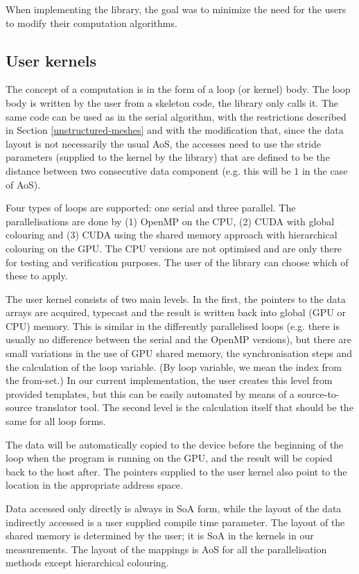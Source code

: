 When implementing the library, the goal was to minimize the need for the users
to modify their computation algorithms.

\subsection{User kernels}

The concept of a computation is in the form of a loop (or kernel) body. The loop
body is written by the user from a skeleton code, the library only calls it. The
same code can be used as in the serial algorithm, with the restrictions
described in Section \ref{unstructured-meshes} and with the modification that,
since the data layout is not necessarily the usual AoS, the accesses need to use
the stride parameters (supplied to the kernel by the library) that are defined
to be the distance between two consecutive data component (e.g. this will be $1$
in the case of AoS).

Four types of loops are supported: one serial and three parallel. The
parallelisations are done by (1) OpenMP on the CPU, (2) CUDA with global
colouring and (3) CUDA using the shared memory approach with hierarchical
colouring on the GPU. The CPU versions are not optimised and are only there for
testing and verification purposes. The user of the library can choose which of
these to apply.

The user kernel consists of two main levels. In the first, the pointers to the
data arrays are acquired, typecast and the result is written back into global
(GPU or CPU) memory. This is similar in the differently parallelised loops (e.g.
there is usually no difference between the serial and the OpenMP versions), but
there are small variations in the use of GPU shared memory, the synchronisation
steps and the calculation of the loop variable. (By loop variable, we mean the
index from the from-set.) In our current implementation, the user creates this
level from provided templates, but this can be easily automated by means of a
source-to-source translator tool. The second level is the calculation itself
that should be the same for all loop forms.

The data will be automatically copied to the device before the beginning of the
loop when the program is running on the GPU, and the result will be copied back
to the host after. The pointers supplied to the user kernel also point to the
location in the appropriate address space.

Data accessed only directly is always in SoA form, while the layout of the
data indirectly accessed is a user supplied compile time parameter. The layout
of the shared memory is determined by the user; it is SoA in the kernels in our
measurements. The layout of the mappings is AoS for all the parallelisation
methods except hierarchical colouring.

